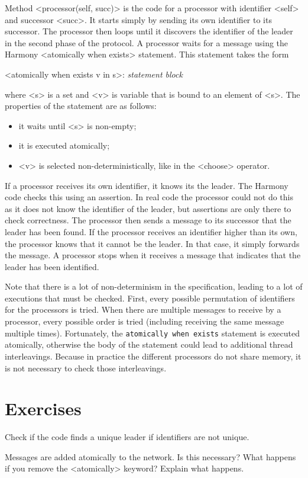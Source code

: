 \documentclass{report}
\newenvironment{code}{
\tcolorbox
}{
\endtcolorbox
}
\begin{document}
Method <{processor(self, succ)}> is the code for a processor with
identifier <{self}> and successor <{succ}>.
It starts simply by sending its own identifier to its successor.
The processor then loops until it discovers the identifier of the
leader in the second phase of the protocol.
A processor waits for a message using the Harmony
<{atomically when exists}> statement.
This statement takes the form
\begin{code}
<{atomically when exists v in s}>: \emph{statement block}
\end{code}
where <{s}> is a set and <{v}> is variable that is bound to an element of <{s}>.
The properties of the statement are as follows:
\begin{itemize}
\item it waits until <{s}> is non-empty;
\item it is executed atomically;
\item <{v}> is selected non-deterministically, like in the <{choose}> operator.
\end{itemize}

If a processor receives its own identifier, it knows its the leader.
The Harmony code checks this using an assertion.
In real code the processor could not do this as it does not know
the identifier of the leader, but assertions are only there to check
correctness.
The processor then sends a message to its successor that the leader
has been found.
If the processor receives an identifier higher than its own, the
processor knows that it cannot be the leader.
In that case, it simply forwards the message.
A processor stops when it receives a message that indicates that
the leader has been identified.

Note that there is a lot of non-determinism in the specification, leading
to a lot of executions that must be checked.
First, every possible permutation of identifiers for the processors
is tried.  When there are multiple messages to receive by a processor,
every possible order is tried (including receiving the same message
multiple times).  Fortunately, the \texttt{atomically when exists} statement
is executed
atomically, otherwise the body of the statement could lead to additional
thread interleavings.  Because in practice the different processors do
not share memory, it is not necessary to check those interleavings.

\section*{Exercises}
\begin{problems}
\item Check if the code finds a unique leader if identifiers are not unique.
\item Messages are added atomically to the network.  Is this necessary?
What happens if you remove the <{atomically}> keyword?  Explain what happens.
\end{problems}
\end{document}
